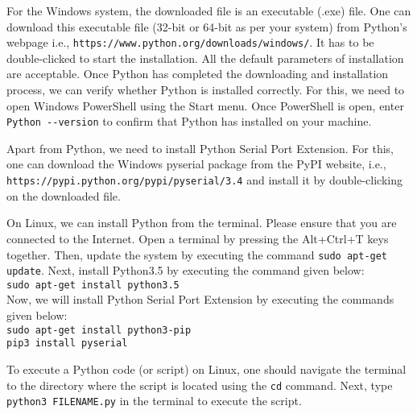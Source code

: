 For the Windows system, the downloaded file is an executable (.exe) file. One can download 
this executable file (32-bit or 64-bit as per your system) from Python's webpage i.e.,
{\tt https://www.python.org/downloads/windows/}. 
It has to be double-clicked to start the installation. All the default parameters of installation
are acceptable. Once Python has completed the downloading and installation process, we can verify whether
Python is installed correctly. For this, we need to open Windows PowerShell using the Start menu. 
Once PowerShell is open, enter {\tt Python -{}-version} to confirm that Python has installed on your machine. 

Apart from Python, we need to install Python Serial Port Extension. 
For this, one can download the
Windows pyserial package from the PyPI website, i.e., {\tt https://pypi.python.org/pypi/pyserial/3.4} and 
install it by double-clicking on the downloaded file. 

On Linux, we can install Python from the terminal. Please ensure that you 
are connected to the Internet. Open a terminal by 
pressing the Alt+Ctrl+T keys together. Then, update the system by executing the 
command {\tt sudo apt-get update}. Next, install Python3.5 by executing the command given below:\\
{\tt sudo apt-get install python3.5}\\
Now, we will install Python Serial Port Extension by executing the commands given below:\\ 
{\tt sudo apt-get install python3-pip \\
pip3 install pyserial}

To execute a Python code (or script) on Linux, one should 
navigate the terminal to the directory where the script is located using the {\tt cd} command.
Next, type {\tt python3 FILENAME.py} in the terminal to execute the script. 





